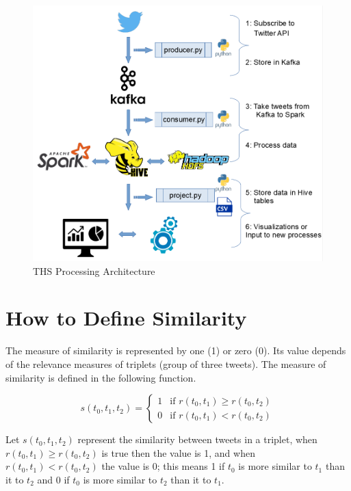 \documentclass[12pt]{report}
\begin{document}
\begin{figure}[H]	
	\centering
	\includegraphics[width=150mm, scale = 1]{images/6_ths_system.png}	
	\caption{\ac{THS} Processing Architecture}	
	\label{figure:ths_system}
\end{figure}

\section{How to Define Similarity}\label{define_similarity}

The measure of similarity is represented by one (1) or zero (0). Its value depends of the relevance measures of triplets (group of three tweets). The measure of similarity is defined in the following function.

\begin{equation}
s(t_0, t_1, t_2) = 
	\begin{cases} 
		1 		& \text{if } r(t_0, t_1) \geq r(t_0, t_2) \\	
		0 		& \text{if } r(t_0, t_1) < r(t_0, t_2)
	\end{cases}
\end{equation}

\noindent Let $s(t_0, t_1, t_2)$ represent the similarity between  tweets in a triplet, when  $r(t_0, t_1) \geq r(t_0,t_2)$ is true then the value is 1, and when $r(t_0, t_1) < r(t_0,t_2)$ the value is 0; this means 1 if  $t_0$ is more similar to $t_1$ than it to $t_2$ and  0  if $t_0$ is more similar to $t_2$ than it to $t_1$.
\end{document}
